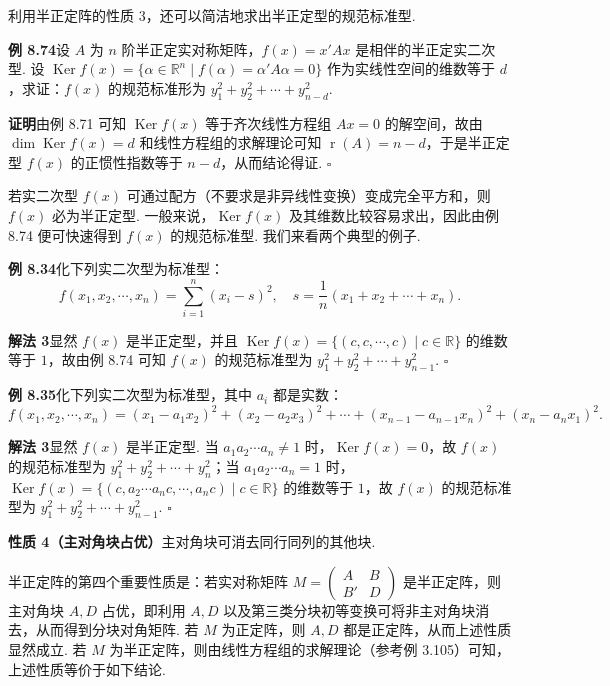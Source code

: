 \documentclass[UTF8, 12pt, fontset=fandol, oneside]{ctexart}
\begin{document}
利用半正定阵的性质 3，还可以简洁地求出半正定型的规范标准型.

\noindent\textbf{例 8.74}\quad 设 $A$ 为 $n$ 阶半正定实对称矩阵，$f(x)=x'Ax$ 是相伴的半正定实二次型. 设 $\operatorname{Ker} f(x)=\{\alpha\in\mathbb{R}^n\mid f(\alpha)=\alpha'A\alpha=0\}$ 作为实线性空间的维数等于 $d$，求证：$f(x)$ 的规范标准形为 $y_1^2+y_2^2+\cdots+y_{n-d}^2$.

\noindent\textbf{证明}\quad 由例 8.71 可知 $\operatorname{Ker} f(x)$ 等于齐次线性方程组 $Ax=0$ 的解空间，故由 $\dim\operatorname{Ker} f(x)=d$ 和线性方程组的求解理论可知 $\operatorname{r}(A)=n-d$，于是半正定型 $f(x)$ 的正惯性指数等于 $n-d$，从而结论得证. $\ensuremath{\square}$

若实二次型 $f(x)$ 可通过配方（不要求是非异线性变换）变成完全平方和，则 $f(x)$ 必为半正定型. 一般来说，$\operatorname{Ker}f(x)$ 及其维数比较容易求出，因此由例 8.74 便可快速得到 $f(x)$ 的规范标准型. 我们来看两个典型的例子.

\noindent\textbf{例 8.34}\quad 化下列实二次型为标准型：
\[
f(x_1,x_2,\cdots,x_n)=\sum_{i=1}^n(x_i-s)^2,\quad s=\frac1n(x_1+x_2+\cdots+x_n).
\]

\noindent\textbf{解法 3}\quad 显然 $f(x)$ 是半正定型，并且 $\operatorname{Ker}f(x)=\{(c,c,\cdots,c)\mid c\in\mathbb{R}\}$ 的维数等于 $1$，故由例 8.74 可知 $f(x)$ 的规范标准型为 $y_1^2+y_2^2+\cdots+y_{n-1}^2$. $\ensuremath{\square}$

\noindent\textbf{例 8.35}\quad 化下列实二次型为标准型，其中 $a_i$ 都是实数：
\[
f(x_1,x_2,\cdots,x_n)=(x_1-a_1x_2)^2+(x_2-a_2x_3)^2+\cdots+(x_{n-1}-a_{n-1}x_n)^2+(x_n-a_nx_1)^2.
\]

\noindent\textbf{解法 3}\quad 显然 $f(x)$ 是半正定型. 当 $a_1a_2\cdots a_n\ne 1$ 时，$\operatorname{Ker}f(x)=0$，故 $f(x)$ 的规范标准型为 $y_1^2+y_2^2+\cdots+y_n^2$；当 $a_1a_2\cdots a_n=1$ 时，$\operatorname{Ker}f(x)=\{(c,a_2\cdots a_nc,\cdots,a_nc)\mid c\in\mathbb{R}\}$ 的维数等于 $1$，故 $f(x)$ 的规范标准型为 $y_1^2+y_2^2+\cdots+y_{n-1}^2$. $\ensuremath{\square}$

\noindent\textbf{性质 4（主对角块占优）}\quad 主对角块可消去同行同列的其他块.

半正定阵的第四个重要性质是：若实对称矩阵 $M=\left(\begin{array}{cc}A&B\\ B'&D\end{array}\right)$ 是半正定阵，则主对角块 $A,D$ 占优，即利用 $A,D$ 以及第三类分块初等变换可将非主对角块消去，从而得到分块对角矩阵. 若 $M$ 为正定阵，则 $A,D$ 都是正定阵，从而上述性质显然成立. 若 $M$ 为半正定阵，则由线性方程组的求解理论（参考例 3.105）可知，上述性质等价于如下结论.
\end{document}
